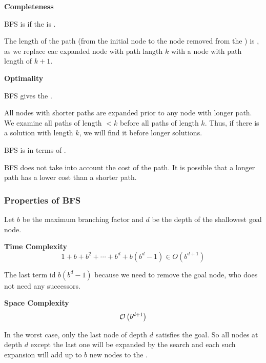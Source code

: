 \begin{listu}
    \item \textbf{Completeness}
    
    \begin{listu}
        \item BFS is  if the  is .
        \item The length of the path (from the initial node to the node removed from the \Frontier) is , as we replace eac expanded node with path langth $k$ with a node with path length of $k + 1$. 
    \end{listu}

    \item \textbf{Optimality}
    
    \begin{listu}
        \item BFS gives the . 

        All nodes with shorter paths are expanded prior to any node with longer path. We examine all paths of length $< k$ before all paths of length $k$. Thus, if there is a solution with length $k$, we will find it before longer solutions. 

        \item BFS is  in terms of .
        
        BFS does not take into account the cost of the path. It is possible that a longer path has a lower cost than a shorter path.
    \end{listu}
\end{listu}


\subsubsection{Properties of BFS}

Let $b$ be the maximum branching factor and $d$ be the depth of the shallowest goal node.

\begin{listu}
    \item \textbf{Time Complexity} \[
        1 + b + b^2 + \cdots + b^d + b(b^d - 1) \in O(b^{d+1})
    \]

    The last term id $b(b^d - 1)$ because we need to remove the goal node, who does not need any successors.

    \item \textbf{Space Complexity} \[
        \mathcal{O}\left(b^{d+1}\right)
    \]
    
    In the worst case, only the last node of depth $d$ satisfies the goal. So all nodes at depth $d$ except the last one will be expanded by the search and each such expansion will add up to $b$ new nodes to the \Frontier.
\end{listu}

